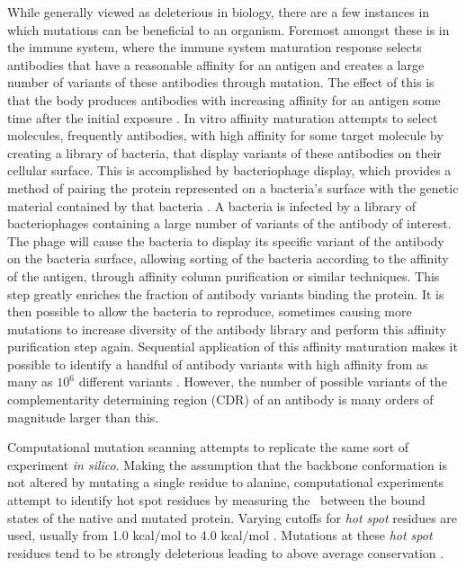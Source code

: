 While generally viewed as deleterious in biology, there are a few instances in which mutations can be beneficial to an organism.
Foremost amongst these is in the immune system, where the immune system maturation response selects antibodies that have a reasonable affinity for an antigen and creates a large number of variants of these antibodies through mutation. 
The effect of this is that the body produces antibodies with increasing affinity for an antigen some time after the initial exposure \cite{griffiths1984somatic}.
In vitro affinity maturation attempts to select molecules, frequently antibodies, with high affinity for some target molecule by creating a library of bacteria, that display variants of these antibodies on their cellular surface.
This is accomplished by bacteriophage display, which provides a method of pairing the protein represented on a bacteria's surface with the genetic material contained by that bacteria \cite{smith1985filamentous}.
A bacteria is infected by a library of bacteriophages containing a large number of variants of the antibody of interest.
The phage will cause the bacteria to display its specific variant of the antibody on the bacteria surface, allowing sorting of the bacteria according to the affinity of the antigen, through affinity column purification or similar techniques.
This step greatly enriches the fraction of antibody variants binding the protein.
It is then possible to allow the bacteria to reproduce, sometimes causing more mutations to increase diversity of the antibody library and perform this affinity purification step again.
Sequential application of this affinity maturation makes it possible to identify a handful of antibody variants with high affinity from as many as $10^{6}$ different variants \cite{gram1992vitro,hawkins1992selection}.
However, the number of possible variants of the complementarity determining region (CDR) of an antibody is many orders of magnitude larger than this.

Computational mutation scanning attempts to replicate the same sort of experiment {\it in silico}.
Making the assumption that the backbone conformation is not altered by mutating a single residue to alanine, computational experiments attempt to identify hot spot residues by measuring the \ddg\ between the bound states of the native and mutated protein.
Varying cutoffs for {\it hot spot} residues are used, usually from 1.0 kcal/mol \cite{kortemme2002simple} to 4.0 kcal/mol \cite{pons1999energetic}.
Mutations at these {\it hot spot} residues tend to be strongly deleterious leading to above average conservation  \cite{hu2000conservation,lichtarge1996evolutionary}.

